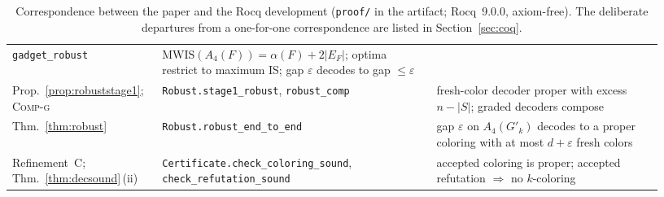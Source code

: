 \documentclass[a4paper,fleqn]{cas-sc}
\newcommand{\MWIS}{\mathrm{MWIS}}
\newcommand{\indep}{\alpha}
\newcommand{\rn}[1]{\textup{\textsc{\footnotesize #1}}}
\begin{document}
\begin{table}[tb]
\begin{tabular}{@{}>{\raggedright\arraybackslash}p{0.20\linewidth}>{\raggedright\arraybackslash}p{0.40\linewidth}>{\raggedright\arraybackslash}p{0.33\linewidth}@{}}
    \texttt{gadget\_robust}
  & $\MWIS(A_4(F))=\indep(F)+2|E_F|$; optima restrict to maximum IS; gap
    $\varepsilon$ decodes to gap $\le\varepsilon$ \\
Prop.~\ref{prop:robuststage1}; \rn{Comp-g}
  & \texttt{Robust.stage1\_robust}, \texttt{robust\_comp}
  & fresh-color decoder proper with excess $n-|S|$; graded decoders compose \\
Thm.~\ref{thm:robust}
  & \texttt{Robust.robust\_end\_to\_end}
  & gap $\varepsilon$ on $A_4(G'_k)$ decodes to a proper coloring with at most
    $d+\varepsilon$ fresh colors \\
Refinement~C; Thm.~\ref{thm:decsound}\,(ii)
  & \texttt{Certificate.check\_coloring\_sound}, \texttt{check\_refutation\_sound}
  & accepted coloring is proper; accepted refutation $\Rightarrow$ no $k$-coloring \\
\bottomrule
\end{tabular}
\caption{Correspondence between the paper and the Rocq development (\texttt{proof/} in
the artifact; Rocq~9.0.0, axiom-free). The deliberate departures from a one-for-one
correspondence are listed in Section~\ref{sec:coq}.}
\label{tab:coq}
\end{table}
\end{document}
